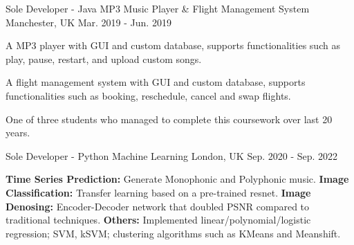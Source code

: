 \begin{cventries}
\cventry
  {Sole Developer - Java} %
  {MP3 Music Player \& Flight Management System} %
  {Manchester, UK} %
  {Mar. 2019 - Jun. 2019} %
  {
    \begin{cvitems} %
      \item {A MP3 player with GUI and custom database, supports functionalities such as play, pause, restart, and upload custom songs.}
      \item {A flight management system with GUI and custom database, supports functionalities such as booking, reschedule, cancel and swap flights.}
      \item {One of three students who managed to complete this coursework over last 20 years.}
    \end{cvitems}
  }
    
  \cventry
    {Sole Developer - Python} %
    {Machine Learning} %
    {London, UK} %
    {Sep. 2020 - Sep. 2022} %
    {
      \begin{cvitems} %
        \item {\textbf{Time Series Prediction:} Generate Monophonic and Polyphonic music. \textbf{Image Classification:} Transfer learning based on a pre-trained resnet. \textbf{Image Denosing:} Encoder-Decoder network that doubled PSNR compared to traditional techniques. \textbf{Others:} Implemented linear/polynomial/logistic regression; SVM, kSVM; clustering algorithms such as KMeans and Meanshift.}
      \end{cvitems}
    }
    



\end{cventries}

